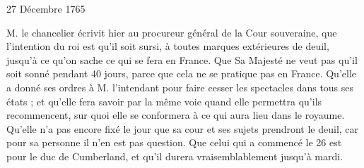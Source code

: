                      \begin{diary}{27 Décembre 1765}{}


                           M. le chancelier écrivit hier
                           au procureur général
                              de la Cour souveraine, que l'intention du roi est
                           qu'il soit sursi, à toutes marques extérieures de
                           deuil, jusqu'à ce qu'on sache ce qui se fera en France.
                           Que Sa Majesté ne veut pas qu'il soit sonné pendant
                           40 jours, parce que cela ne se pratique pas en France.
                           Qu'elle a donné ses ordres à M.
                              l'intendant pour faire
                           cesser les spectacles dans tous ses états ; et qu'elle
                           fera savoir par la même voie quand elle
                           permettra qu'ils recommencent, sur quoi elle
                           se conformera à ce qui aura lieu dans le
                           royaume. Qu'elle n'a pas encore fixé le jour que
                           sa cour et ses sujets prendront le deuil, car
                           pour sa personne il n'en est pas question.
                           Que celui qui a commencé le 26 est
                           pour
                           le duc de Cumberland,
                           et qu'il durera vraisemblablement
                           jusqu'à mardi. \bigskip



\end{diary}
